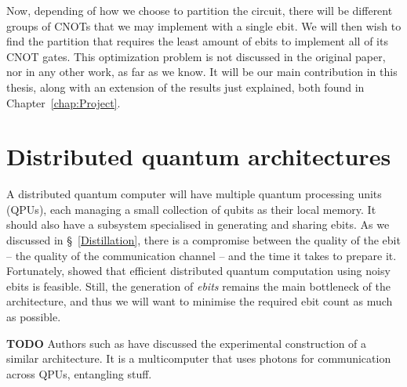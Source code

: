 Now, depending of how we choose to partition the circuit, there will be different groups of CNOTs that we may implement with a single ebit. We will then wish to find the partition that requires the least amount of ebits to implement all of its CNOT gates. This optimization problem is not discussed in the original paper, nor in any other work, as far as we know. It will be our main contribution in this thesis, along with an extension of the results just explained, both found in Chapter~\ref{chap:Project}.


\section{Distributed quantum architectures}
\label{DQC_Architecture} 

A distributed quantum computer will have multiple quantum processing units (QPUs), each managing a small collection of qubits as their local memory. It should also have a subsystem specialised in generating and sharing ebits. As we discussed in \S~\ref{Distillation}, there is a compromise between the quality of the ebit -- the quality of the communication channel -- and the time it takes to prepare it. Fortunately, \citet{NoisyChannels} showed that efficient distributed quantum computation using noisy ebits is feasible. Still, the generation of \textit{ebits} remains the main bottleneck of the architecture, and thus we will want to minimise the required ebit count as much as possible. 

\textbf{TODO} Authors such as \citet{DistributedQCHW} have discussed the experimental construction of a similar architecture. It is a multicomputer that uses photons for communication across QPUs, entangling stuff. 